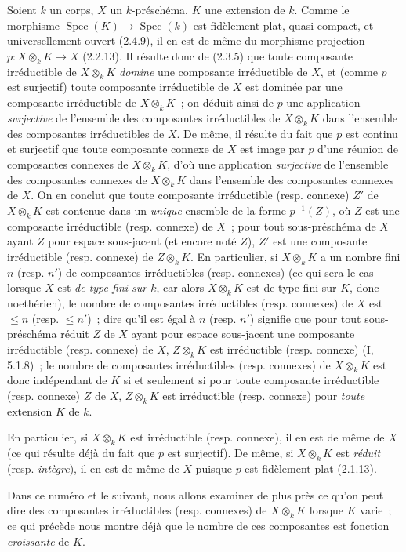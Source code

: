 \begin{env}[4.4.1]
\label{IV.2.4.4.1-fr}
Soient $k$ un corps, $X$ un $k$-préschéma, $K$ une extension de $k$. Comme le
morphisme $\operatorname{Spec}(K)\to\operatorname{Spec}(k)$ est fidèlement
plat, quasi-compact, et universellement ouvert (2.4.9), il en est de même du
morphisme projection $p:X\otimes_k K\to X$ (2.2.13). Il résulte donc de
(2.3.5) que toute composante irréductible de $X\otimes_k K$ \emph{domine} une
composante irréductible de $X$, et (comme $p$ est surjectif) toute composante
irréductible de $X$ est dominée par une composante irréductible de
$X\otimes_k K$~; on déduit ainsi de $p$ une application \emph{surjective} de
l'ensemble des composantes irréductibles de $X\otimes_k K$ dans l'ensemble
des composantes irréductibles de $X$. De même, il résulte du fait que $p$ est
continu et surjectif que toute composante connexe de $X$ est image par $p$
d'une réunion de composantes connexes de $X\otimes_k K$, d'où une application
\emph{surjective} de l'ensemble des composantes connexes de $X\otimes_k K$
dans l'ensemble des composantes connexes de $X$. On en conclut que toute
composante irréductible (resp. connexe) $Z'$ de $X\otimes_k K$ est contenue
dans un \emph{unique} ensemble de la forme $p^{-1}(Z)$, où $Z$ est une
composante irréductible (resp. connexe) de $X$~; pour tout sous-préschéma de
$X$ ayant $Z$ pour espace sous-jacent (et encore noté $Z$), $Z'$ est une
composante irréductible (resp. connexe) de $Z\otimes_k K$. En particulier, si
$X\otimes_k K$ a un nombre fini $n$ (resp. $n'$) de composantes irréductibles
(resp. connexes) (ce qui sera le cas lorsque $X$ est \emph{de type fini sur
$k$}, car alors $X\otimes_k K$ est de type fini sur $K$, donc noethérien), le
nombre de composantes irréductibles (resp. connexes) de $X$ est $\leqslant n$
(resp. $\leqslant n'$)~; dire qu'il est égal à $n$ (resp. $n'$) signifie que
pour tout sous-préschéma réduit $Z$ de $X$ ayant pour espace sous-jacent une
composante irréductible (resp. connexe) de $X$, $Z\otimes_k K$ est
irréductible (resp. connexe) (I, 5.1.8)~; le nombre de composantes
irréductibles (resp. connexes) de $X\otimes_k K$ est donc indépendant de $K$
si et seulement si pour toute composante irréductible (resp. connexe) $Z$ de
$X$, $Z\otimes_k K$ est irréductible (resp. connexe) pour \emph{toute}
extension $K$ de $k$.

En particulier, si $X\otimes_k K$ est irréductible (resp. connexe), il en est
de même de $X$ (ce qui résulte déjà du fait que $p$ est surjectif). De même, si
$X\otimes_k K$ est \emph{réduit} (resp. \emph{intègre}), il en est de même de
$X$ puisque $p$ est fidèlement plat (2.1.13).

Dans ce numéro et le suivant, nous allons examiner de plus près ce qu'on peut
dire des composantes irréductibles (resp. connexes) de $X\otimes_k K$ lorsque
$K$ varie~; ce qui précède nous montre déjà que le nombre de ces composantes
est fonction \emph{croissante} de $K$.
\end{env}

